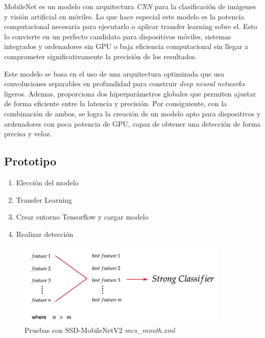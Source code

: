 MobileNet es un modelo con arquitectura \textit{CNN} para la clasificación de imágenes y visión artificial en móviles. Lo que hace especial este modelo es la potencia computacional necesaria para ejecutarlo o aplicar transfer learning sobre el. Esto lo convierte en un perfecto candidato para dispositivos móviles, sistemas integrados y ordenadores sin GPU o baja eficiencia computacional sin llegar a comprometer significativamente la precisión de los resultados.

Este modelo se basa en el uso de una arquitectura optimizada que usa convoluciones separables en profundidad para construir \textit{deep neural networks} ligeros. Ademas, proporciona dos hiperparámetros globales que permiten ajustar de forma eficiente entre la latencia y precisión. Por consiguiente, con la combinación de ambos, se logra la creación de un modelo apto para dispositivos y ordenadores con poca potencia de GPU, capaz de obtener una detección de forma precisa y veloz.

\subsection*{Prototipo}

\begin{enumerate}
	\item Elección del modelo
	\item Transfer Learning
	\item Crear entorno Tensorflow y cargar modelo
	\item Realizar detección
\end{enumerate}

\begin{figure}[htp]
	\centering
	\includegraphics[width=10cm]{imagenes/ada1.png}
	\caption{Pruebas con SSD-MobileNetV2 \textit{mcs\_mouth.xml}}
	\label{fig:protoTensorFlow}
\end{figure}

